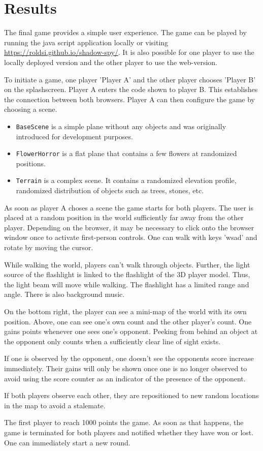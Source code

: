 \documentclass[11pt]{article}
\begin{document}
\section{Results}
\par The final game provides a simple user experience. The game can be played by running the java script application locally or visiting \href{https://google.com}{https://roldsi.github.io/shadow-spy/}. It is also possible for one player to use the locally deployed version and the other player to use the web-version.
\par To initiate a game, one player 'Player A' and the other player chooses 'Player B' on the splashscreen. Player A enters the code shown to player B. This establishes the connection between both browsers. Player A can then configure the game by choosing a scene.
\begin{itemize}
	\item \texttt{BaseScene} is a simple plane without any objects and was originally introduced for development purposes.
	\item \texttt{FlowerHorror} is a flat plane that contains a few flowers at randomized positions.
	\item \texttt{Terrain} is a complex scene. It contains a randomized elevation profile, randomized distribution of objects such as trees, stones, etc.
\end{itemize}
\par As soon as player A choses a scene the game starts for both players. The user is placed at a random position in the world sufficiently far away from the other player. Depending on the browser, it may be necessary to click onto the browser window once to activate first-person controls. One can walk with keys 'wsad' and rotate by moving the cursor.
\par While walking the world, players can't walk through objects. Further, the light source of the flashlight is linked to the flashlight of the 3D player model. Thus, the light beam will move while walking. The flashlight has a limited range and angle.
There is also background music.
\par On the bottom right, the player can see a mini-map of the world with its own position. Above, one can see one's own count and the other player's count. One gains points whenever one sees one's opponent. Peeking from behind an object at the opponent only counts when a sufficiently clear line of sight exists.
\par If one is observed by the opponent, one doesn't see the opponents score increase immediately. Their gains will only be shown once one is no longer observed to avoid using the score counter as an indicator of the presence of the opponent.
\par If both players observe each other, they are repositioned to new random locations in the map to avoid a stalemate.
\par The first player to reach 1000 points the game. As soon as that happens, the game is terminated for both players and notified whether they have won or lost. One can immediately start a new round.
\end{document}
